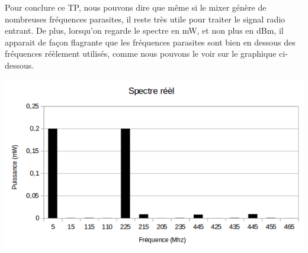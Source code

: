 \documentclass[a4paper,12pt]{report}            %
\begin{document}
    Pour conclure ce TP, nous pouvons dire que même si le mixer génère de nombreuses fréquences parasites, 
il reste très utile pour traiter le signal radio entrant. De plus, lorsqu'on regarde le spectre en mW, et non plus
en dBm, il apparait de façon flagrante que les fréquences parasites sont bien en dessous des fréquences
réèlement utilisés, comme nous pouvons le voir sur le graphique ci-dessous. 
\begin{center}\includegraphics[scale = 0.7]{pic/spectre_mw.png}\\ \end{center}

\end{document}
